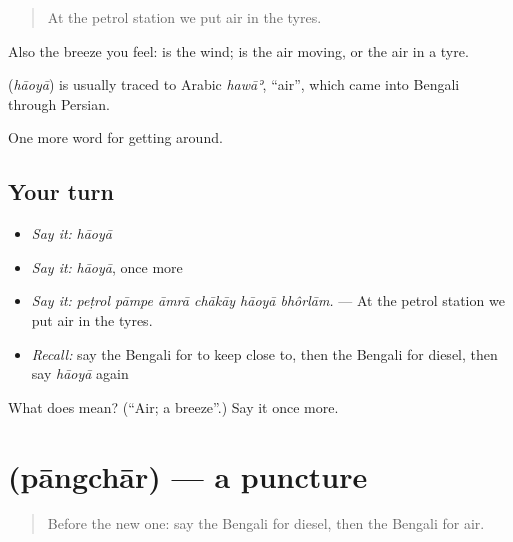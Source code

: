 \begin{quote}
At the petrol station we put air in the tyres.
\end{quote}

Also the breeze you feel:  is the wind;  is the air moving, or the air in a tyre.

\begin{cousinweb}
\textbf{} (\emph{hāoyā}) is usually traced to Arabic \emph{hawāʾ}, \textquotedblleft{}air\textquotedblright{}, which came into Bengali through Persian.
\end{cousinweb}

\begin{grammarlens}[title={What you've built}]
One more word for getting around.
\end{grammarlens}

\subsection*{Your turn}
\begin{itemize}
\raggedright
  \item \emph{Say it:} \emph{hāoyā}
  \item \emph{Say it:} \emph{hāoyā}, once more
  \item \emph{Say it:} \emph{peṭrol pāmpe āmrā chākāy hāoyā bhôrlām.} — At the petrol station we put air in the tyres.
  \item \emph{Recall:} say the Bengali for to keep close to, then the Bengali for diesel, then say \emph{hāoyā} again
\end{itemize}

\begin{tcolorbox}[breakable,colback=teal!4,colframe=teal!35!black,title={Before you move on}]
What does  mean? (\textquotedblleft{}Air; a breeze\textquotedblright{}.) Say it once more.
\end{tcolorbox}
\section[\texorpdfstring{\bn{পাংচার} (pāngchār)}{পাংচার (pāngchār)}]{ (pāngchār) — a puncture}

\label{lesson:BN-C393-pangchar}



\begin{quote}
Before the new one: say the Bengali for diesel, then the Bengali for air.
\end{quote}

